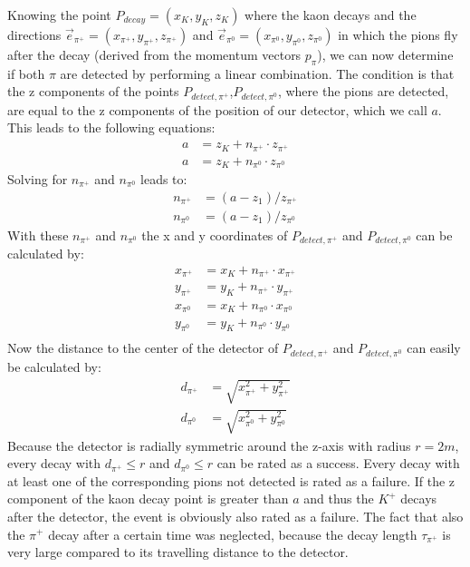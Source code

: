 \documentclass[a4paper,parskip,11pt, DIV12]{scrreprt}
\begin{document}
	Knowing the point $P_{decay}=(x_K,y_K,z_K)$  where the kaon decays and the directions $\vec{e}_{\pi^+}=(x_{\pi^+},y_{\pi^+},z_{\pi^+})$ and $\vec{e}_{\pi^0}=(x_{\pi^0},y_{\pi^0},z_{\pi^0})$ in which the pions fly after the decay (derived from the momentum vectors $p_{\pi}$), we can now determine if both $\pi$ are detected by performing a linear combination. The condition is that the z components of the points $P_{detect,\pi^+}$,$P_{detect,\pi^0}$, where the pions are detected, are equal to the z components of the position of our detector, which we call $a$. This leads to the following equations:
	\begin{align*}
		a &= z_K + n_{\pi^+} \cdot z_{\pi^+} \\ 
		a &= z_K + n_{\pi^0} \cdot z_{\pi^0}
	\end{align*} 
	Solving for $n_{\pi^+}$ and  $n_{\pi^0}$ leads to: 
	\begin{align*}
		n_{\pi^+} &= (a-z_1)/z_{\pi^+}\\
		n_{\pi^0} &= (a-z_1)/z_{\pi^0}
	\end{align*}
	With these $n_{\pi^+}$ and $n_{\pi^0}$ the x and y coordinates of $P_{detect,\pi^+}$ and $P_{detect,\pi^0}$ can be calculated by:
	\begin{align*}
		x_{\pi^+} &= x_K+n_{\pi^+} \cdot x_{\pi^+}\\
		y_{\pi^+} &= y_K+n_{\pi^+} \cdot y_{\pi^+}\\
		x_{\pi^0} &= x_K+n_{\pi^0} \cdot x_{\pi^0}\\
		y_{\pi^0} &= y_K+n_{\pi^0} \cdot y_{\pi^0}\\
	\end{align*}
	Now the distance to the center of the detector of $P_{detect,\pi^+}$ and $P_{detect,\pi^0}$ can easily be calculated by:
	\begin{align*}
		d_{\pi^+} &= \sqrt{x_{\pi^+}^2 + y_{\pi^+}^2}\\
		d_{\pi^0} &= \sqrt{x_{\pi^0}^2 +  y_{\pi^0}^2} 
	\end{align*}
	Because the detector is radially symmetric around the z-axis with radius $r=2m$, every decay with $d_{\pi^+} \leq r$ and $d_{\pi^0} \leq r$ can be rated as a success. Every decay with at least one of the corresponding pions not detected is rated as a failure. 
	If the z component of the kaon decay point is greater than $a$ and thus the $K^+$ decays after the detector, the event is obviously also rated as a failure. The fact that also the $\pi^+$ decay after a certain time was neglected, because the decay length $\tau_{\pi^+}$ is very large compared to its travelling distance to the detector.
	
\end{document}
